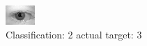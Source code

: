 \begin{figure}[h!]
\begin{center}
\includegraphics[width=0.60\columnwidth]{figures/ID513_class_2_target_3.png}
\end{center}
\caption{ Classification: 2 actual target: 3}
\label{fig:ID513_class_2_target_3}
\end{figure}
